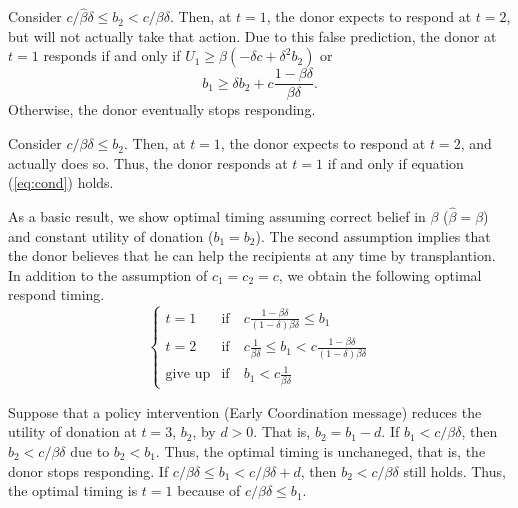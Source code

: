 \documentclass[
]{article}
\begin{document}
Consider \(c / \hat{\beta}\delta \le b_2 < c/\beta\delta\). Then, at \(t = 1\), the donor expects to respond at \(t = 2\), but will not actually take that action. Due to this false prediction, the donor at \(t = 1\) responds if and only if \(U_1 \ge \beta(-\delta c + \delta^2 b_2)\) or
\begin{equation}
  b_1 \ge \delta b_2 + c \frac{1 - \beta\delta}{\beta\delta}. \label{eq:cond}
\end{equation}
Otherwise, the donor eventually stops responding.

Consider \(c/\beta\delta \le b_2\). Then, at \(t = 1\), the donor expects to respond at \(t = 2\), and actually does so. Thus, the donor responds at \(t = 1\) if and only if equation (\ref{eq:cond}) holds.

As a basic result, we show optimal timing assuming correct belief in \(\beta\) (\(\hat{\beta} = \beta\)) and constant utility of donation (\(b_1 = b_2\)). The second assumption implies that the donor believes that he can help the recipients at any time by transplantion. In addition to the assumption of \(c_1 = c_2 = c\), we obtain the following optimal respond timing.
\begin{equation}
  \begin{cases}
    t = 1 &\text{if}\quad c \frac{1 - \beta\delta}{(1-\delta)\beta\delta} \le b_1 \\
    t = 2 &\text{if}\quad c \frac{1}{\beta\delta} \le b_1  < c \frac{1 - \beta\delta}{(1-\delta)\beta\delta}\\
    \text{give up} &\text{if}\quad b_1 < c \frac{1}{\beta\delta}
  \end{cases}
\end{equation}

Suppose that a policy intervention (Early Coordination message) reduces the utility of donation at \(t = 3\), \(b_2\), by \(d > 0\). That is, \(b_2 = b_1 - d\). If \(b_1 < c/\beta\delta\), then \(b_2 < c /\beta\delta\) due to \(b_2 < b_1\). Thus, the optimal timing is unchaneged, that is, the donor stops responding. If \(c/\beta\delta \le b_1 < c/\beta\delta + d\), then \(b_2 < c/\beta\delta\) still holds. Thus, the optimal timing is \(t = 1\) because of \(c/\beta\delta \le b_1\).
\end{document}
